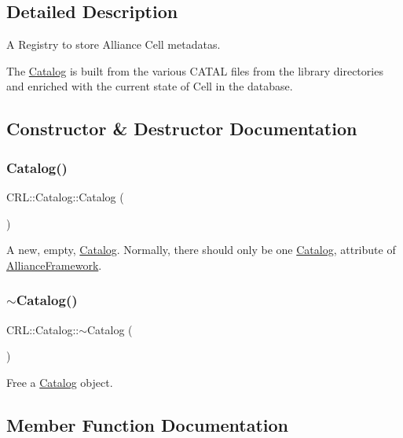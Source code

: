 \subsection{Detailed Description}
A Registry to store Alliance Cell metadatas. 

The \hyperlink{classCRL_1_1Catalog}{Catalog} is built from the various C\+A\+T\+AL files from the library directories and enriched with the current state of Cell in the database. 

\subsection{Constructor \& Destructor Documentation}
\mbox{\label{classCRL_1_1Catalog_a6682f773880c7ca16bdca79057a08e6b}} 
\subsubsection{\texorpdfstring{Catalog()}{Catalog()}}
{\footnotesize\ttfamily C\+R\+L\+::\+Catalog\+::\+Catalog (\begin{DoxyParamCaption}{ }\end{DoxyParamCaption})\hspace{0.3cm}{\ttfamily [inline]}}

A new, empty, \hyperlink{classCRL_1_1Catalog}{Catalog}. Normally, there should only be one \hyperlink{classCRL_1_1Catalog}{Catalog}, attribute of \hyperlink{classCRL_1_1AllianceFramework}{Alliance\+Framework}. \mbox{\label{classCRL_1_1Catalog_a3ad457a2bf6246c3a1d9c3a4730c2696}} 
\subsubsection{\texorpdfstring{$\sim$\+Catalog()}{~Catalog()}}
{\footnotesize\ttfamily C\+R\+L\+::\+Catalog\+::$\sim$\+Catalog (\begin{DoxyParamCaption}{ }\end{DoxyParamCaption})}

Free a \hyperlink{classCRL_1_1Catalog}{Catalog} object. 

\subsection{Member Function Documentation}
\mbox{\label{classCRL_1_1Catalog_a5b04db2b2179d70212dd1b12daa903f9}} 
